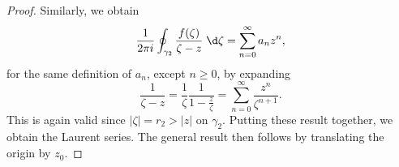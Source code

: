 \documentclass[a4paper]{article}
\begin{document}
\begin{proof}
  Similarly, we obtain
  \[
    \frac{1}{2\pi i} \oint_{\gamma_2} \frac{f(\zeta)}{\zeta - z}\;\d \zeta = \sum_{n = 0}^\infty a_n z^n,
  \]
  for the same definition of $a_n$, except $n \geq 0$, by expanding
  \[
    \frac{1}{\zeta - z} = \frac{1}{\zeta} \frac{1}{1 - \frac{z}{\zeta}} = \sum_{n = 0}^\infty \frac{z^n}{\zeta^{n + 1}}.
  \]
  This is again valid since $|\zeta| = r_2 > |z|$ on $\gamma_2$. Putting these result together, we obtain the Laurent series. The general result then follows by translating the origin by $z_0$.
\end{proof}
\end{document}
